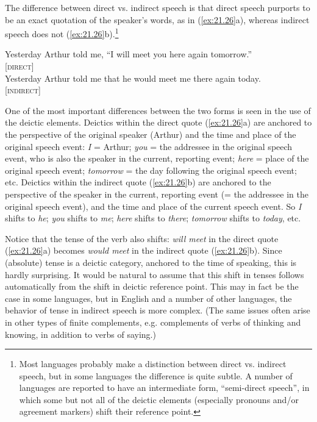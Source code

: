 The difference between direct vs. indirect speech is that direct speech purports to be an exact quotation of the speaker’s words, as in (\ref{ex:21.26}a), whereas indirect speech does not (\ref{ex:21.26}b).\footnote{Most languages probably make a distinction between direct vs. indirect speech, but in some languages the difference is quite subtle. A number of languages are reported to have an intermediate form, “semi-direct speech”, in which some but not all of the deictic elements (especially pronouns and/or agreement markers) shift their reference point.}


\ea \label{ex:21.26}
\ea  Yesterday Arthur told me, “I will meet you here again tomorrow.” \\ 
\hfill  [\textsc{direct}]\\
\ex Yesterday Arthur told me that he would meet me there again today. \\
\hfill [\textsc{indirect}]
                       \z
\z


One of the most important differences between the two forms is seen in the use of the deictic elements. Deictics within the direct quote (\ref{ex:21.26}a) are anchored to the perspective of the original speaker (Arthur) and the time and place of the original speech event: \textit{I} = Arthur; \textit{you} = the addressee in the original speech event, who is also the speaker in the current, reporting event; \textit{here} = place of the original speech event; \textit{tomorrow} = the day following the original speech event; etc. Deictics within the indirect quote (\ref{ex:21.26}b) are anchored to the perspective of the speaker in the current, reporting event (= the addressee in the original speech event), and the time and place of the current speech event. So \textit{I} shifts to \textit{he}; \textit{you} shifts to \textit{me}; \textit{here} shifts to \textit{there}; \textit{tomorrow} shifts to \textit{today}, etc.



Notice that the tense of the verb also shifts: \textit{will meet} in the direct quote (\ref{ex:21.26}a) becomes \textit{would meet} in the indirect quote (\ref{ex:21.26}b). Since (absolute) tense is a deictic category, anchored to the time of speaking, this is hardly surprising. It would be natural to assume that this shift in tenses follows automatically from the shift in deictic reference point. This may in fact be the case in some languages, but in English and a number of other languages, the behavior of tense in indirect speech is more complex. (The same issues often arise in other types of finite complements, e.g. complements of verbs of thinking and knowing, in addition to verbs of saying.)



